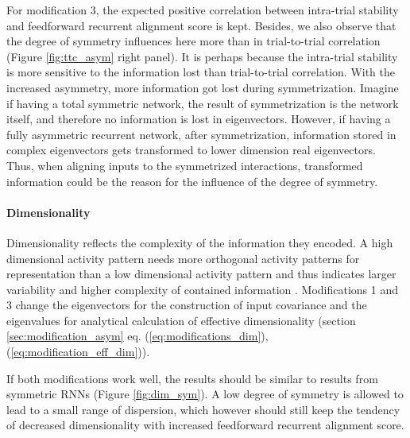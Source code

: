 \documentclass[11pt]{article}
\begin{document}
	For modification 3, the expected positive correlation between intra-trial stability and feedforward recurrent alignment score is kept. Besides, we also observe that the degree of symmetry influences here more than in trial-to-trial correlation (Figure \ref{fig:ttc_asym} right panel). It is perhaps because the intra-trial stability is more sensitive to the information lost than trial-to-trial correlation. With the increased asymmetry, more information got lost during symmetrization. Imagine if having a total symmetric network, the result of symmetrization is the network itself, and therefore no information is lost in eigenvectors. However, if having a fully asymmetric recurrent network, after symmetrization, information stored in complex eigenvectors gets transformed to lower dimension real eigenvectors. Thus, when aligning inputs to the symmetrized interactions, transformed information could be the reason for the influence of the degree of symmetry. 
	\vspace{0.5cm}
	\paragraph{Dimensionality}
	
	Dimensionality reflects the complexity of the information they encoded. A high dimensional activity pattern needs more orthogonal activity patterns for representation than a low dimensional activity pattern and thus indicates larger variability and higher complexity of contained information \cite{tragenap2023nature, bartolo2020dimensionality, badre2021dimensionality}. Modifications 1 and 3 change the eigenvectors for the construction of input covariance and the eigenvalues for analytical calculation of effective dimensionality (section \ref{sec:modification_asym} eq. (\ref{eq:modifications_dim}), (\ref{eq:modification_eff_dim})). 
	
	If both modifications work well, the results should be similar to results from symmetric RNNs (Figure \ref{fig:dim_sym}). A low degree of symmetry is allowed to lead to a small range of dispersion, which however should still keep the tendency of decreased dimensionality with increased feedforward recurrent alignment score. %
	
\end{document}
